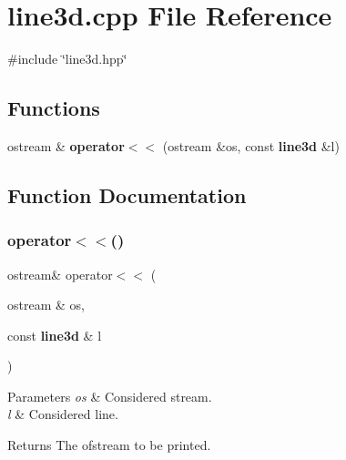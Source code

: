 \section{line3d.\+cpp File Reference}
\label{line3d_8cpp}
{\ttfamily \#include \char`\"{}line3d.\+hpp\char`\"{}}\newline
\subsection*{Functions}
\begin{DoxyCompactItemize}
\item 
ostream \& \textbf{ operator$<$$<$} (ostream \&os, const \textbf{ line3d} \&l)
\end{DoxyCompactItemize}


\subsection{Function Documentation}
\mbox{\label{line3d_8cpp_aa9bf6fbe3751bb3e1bbb768fab7e1309}} 
\subsubsection{operator$<$$<$()}
{\footnotesize\ttfamily ostream\& operator$<$$<$ (\begin{DoxyParamCaption}\item[{ostream \&}]{os,  }\item[{const \textbf{ line3d} \&}]{l }\end{DoxyParamCaption})}


\begin{DoxyParams}{Parameters}
{\em os} & Considered stream. \\
\hline
{\em l} & Considered line. \\
\hline
\end{DoxyParams}
\begin{DoxyReturn}{Returns}
The ofstream to be printed. 
\end{DoxyReturn}
